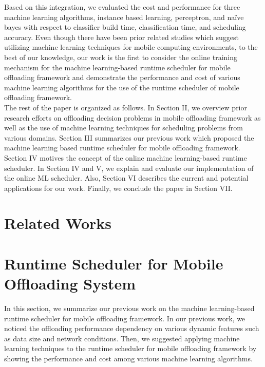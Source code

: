 \documentclass[10pt, conference, compsocconf]{IEEEtran}
\begin{document}
%
Based on this integration, we evaluated the cost and performance for
three machine learning algorithms, instance based learning, perceptron,
and na\"{i}ve bayes with respect to classifier build time,
classification time, and scheduling accuracy.
%
Even though there have been prior related studies which suggest
utilizing machine learning techniques for mobile computing environments,
to the best of our knowledge, our work is the first to consider the
online training mechanism for the machine learning-based runtime
scheduler for mobile offloading framework and demonstrate the
performance and cost of various machine learning algorithms for the use
of the runtime scheduler of mobile offloading framework.\\   
%
\indent The rest of the paper is organized  as follows.
%
In Section II, we overview prior research efforts on offloading decision
problems in mobile offloading framework as well as the use of machine
learning techniques for scheduling problems from various domains.
%
Section III summarizes our previous work which proposed the machine
learning based runtime scheduler for mobile offloading framework.
%
Section IV motives the concept of the online machine learning-based
runtime scheduler.
%
In Section IV and V, we explain and evaluate our implementation of the
online ML scheduler.
%
Also, Section VI describes the current and potential applications for
our work.
%
Finally, we conclude the paper in Section VII.
%
\section{Related Works}
%
\section{Runtime Scheduler for Mobile Offloading System}
%
In this section, we summarize our previous work on the machine
learning-based runtime scheduler for mobile offloading framework.
%
In our previous work, we noticed the offloading performance dependency on
various dynamic features such as data size and network conditions.
%
Then, we suggested applying machine learning techniques to the runtime
scheduler for mobile offloading framework by showing the performance and
cost among various machine learning algorithms. 
% 
\end{document}

